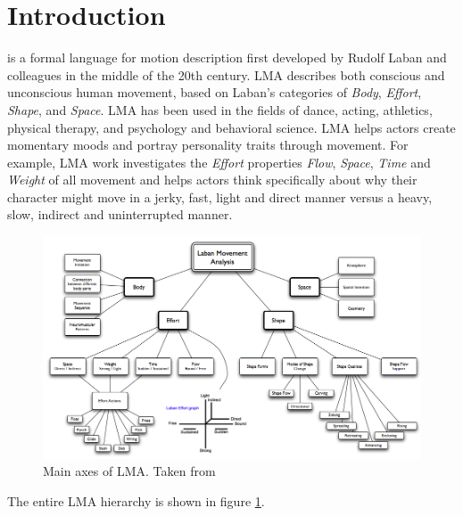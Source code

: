 \documentclass[journal]{journal}
\begin{document}
\section{Introduction}
% 
% 
% 
% 
 is a formal language for motion description first
developed by Rudolf Laban \cite{Laban} and colleagues in the middle of the 20th century.
LMA describes both conscious and unconscious human movement, based on Laban's categories of \textit{Body}, \textit{Effort}, \textit{Shape}, and \textit{Space}. 
LMA has been used in the fields of dance, acting, athletics, physical therapy, and psychology and behavioral science.
LMA helps actors create momentary moods and portray personality traits through
movement. For example, LMA work investigates the \textit{Effort} properties
\textit{Flow}, \textit{Space}, \textit{Time} and \textit{Weight} of all movement and helps actors 
think specifically about why their character might move in a jerky, fast, light and direct manner 
versus a heavy, slow, indirect and uninterrupted manner.
\begin{figure}[ht]
\centering
\includegraphics[width=\textwidth]{laban.png}
\caption{Main axes of LMA. Taken from \cite{labanTree}}
\label{labanTree}
\end{figure}
The entire LMA hierarchy is shown in figure \ref{labanTree}.
\IEEEpubidadjcol
\end{document}
